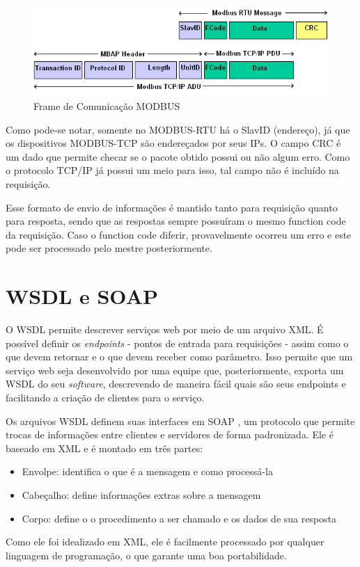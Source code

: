 \begin{figure}[H]
        \begin{center}
                \includegraphics[width=\textwidth,natwidth=585,natheight=180]{assets/images/modbus-frame.png}
                \caption{Frame de Comunicação MODBUS}
                \label{fig:modbus-frame}
        \end{center}
\end{figure}

Como pode-se notar, somente no MODBUS-RTU há o SlavID (endereço), já que os dispositivos MODBUS-TCP são endereçados por seus IPs. O campo CRC é um dado que permite checar se o pacote obtido possui ou não algum erro. Como o protocolo TCP/IP já possui um meio para isso, tal campo não é incluído na requisição.

Esse formato de envio de informações é mantido tanto para requisição quanto para resposta, sendo que as respostas sempre possuíram o mesmo function code da requisição. Caso o function code diferir, provavelmente ocorreu um erro e este pode ser processado pelo mestre posteriormente.

\section{WSDL e SOAP}

O WSDL \cite{w3c-spec-wsdl} permite descrever serviços web por meio de um arquivo XML. É possível definir os \textit{endpoints} - pontos de entrada para requisições - assim como o que devem retornar e o que devem receber como parâmetro. Isso permite que um serviço web seja desenvolvido por uma equipe que, posteriormente, exporta um WSDL do seu \textit{software}, descrevendo de maneira fácil quais são seus endpoints e facilitando a criação de clientes para o serviço.

Os arquivos WSDL definem suas interfaces em SOAP \cite{w3c-spec-soapspec}, um protocolo que permite trocas de informações entre clientes e servidores de forma padronizada. Ele é baseado em XML e é montado em três partes:
\begin{itemize}
  \item Envolpe: identifica o que é a mensagem e como processá-la
  \item Cabeçalho: define informações extras sobre a mensagem
  \item Corpo: define o o procedimento a ser chamado e os dados de sua resposta
\end{itemize}

Como ele foi idealizado em XML, ele é facilmente processado por qualquer linguagem de programação, o que garante uma boa portabilidade.
